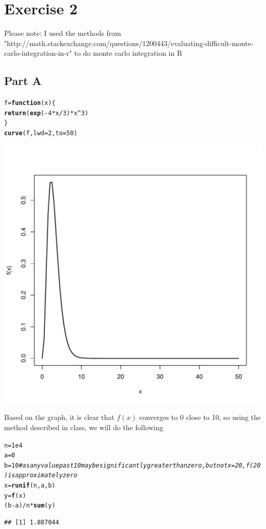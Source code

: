 \documentclass{article}\usepackage[]{graphicx}\usepackage[]{color}
\makeatletter
\newcommand{\hlnum}[1]{\textcolor[rgb]{0.686,0.059,0.569}{#1}}%
\newcommand{\hlcom}[1]{\textcolor[rgb]{0.678,0.584,0.686}{\textit{#1}}}%
\newcommand{\hlopt}[1]{\textcolor[rgb]{0,0,0}{#1}}%
\newcommand{\hlstd}[1]{\textcolor[rgb]{0.345,0.345,0.345}{#1}}%
\newcommand{\hlkwa}[1]{\textcolor[rgb]{0.161,0.373,0.58}{\textbf{#1}}}%
\newcommand{\hlkwb}[1]{\textcolor[rgb]{0.69,0.353,0.396}{#1}}%
\newcommand{\hlkwc}[1]{\textcolor[rgb]{0.333,0.667,0.333}{#1}}%
\newcommand{\hlkwd}[1]{\textcolor[rgb]{0.737,0.353,0.396}{\textbf{#1}}}%
\newenvironment{kframe}{%
 \def\at@end@of@kframe{}%
 \ifinner\ifhmode%
  \def\at@end@of@kframe{\end{minipage}}%
  \begin{minipage}{\columnwidth}%
 \fi\fi%
 \def\FrameCommand##1{\hskip\@totalleftmargin \hskip-\fboxsep
 \colorbox{shadecolor}{##1}\hskip-\fboxsep
     \hskip-\linewidth \hskip-\@totalleftmargin \hskip\columnwidth}%
 \MakeFramed {\advance\hsize-\width
   \@totalleftmargin\z@ \linewidth\hsize
   \@setminipage}}%
 {\par\unskip\endMakeFramed%
 \at@end@of@kframe}
\newenvironment{knitrout}{}{} %
\makeatother
\begin{document}
\section*{Exercise 2}
Please note: I used the methods from "http://math.stackexchange.com/questions/1200443/evaluating-difficult-monte-carlo-integration-in-r" to do monte carlo integration in R
\subsection*{Part A}
\begin{knitrout}
\color{fgcolor}\begin{kframe}
\begin{alltt}
\hlstd{f} \hlkwb{=} \hlkwa{function}\hlstd{(}\hlkwc{x}\hlstd{)\{}
  \hlkwd{return}\hlstd{(}\hlkwd{exp}\hlstd{(}\hlopt{-}\hlnum{4}\hlopt{*}\hlstd{x}\hlopt{/}\hlnum{3}\hlstd{)}\hlopt{*}\hlstd{x}\hlopt{^}\hlnum{3}\hlstd{)}
\hlstd{\}}
\hlkwd{curve}\hlstd{(f,} \hlkwc{lwd}\hlstd{=}\hlnum{2}\hlstd{,}\hlkwc{to} \hlstd{=} \hlnum{50}\hlstd{)}
\end{alltt}
\end{kframe}
\includegraphics[width=0.60\linewidth]{figure/unnamed-chunk-3-1} 

\end{knitrout}
Based on the graph, it is clear that $f(x)$ converges to 0 close to 10, so using the method described in class, we will do the following
\begin{knitrout}
\color{fgcolor}\begin{kframe}
\begin{alltt}
\hlstd{n} \hlkwb{=} \hlnum{1e4}
\hlstd{a} \hlkwb{=} \hlnum{0}
\hlstd{b} \hlkwb{=} \hlnum{10} \hlcom{#as any value past 10 may be significantly greater than zero, but not x = 20, f(20) is approximately zero}
\hlstd{x} \hlkwb{=} \hlkwd{runif}\hlstd{(n, a, b)}
\hlstd{y} \hlkwb{=} \hlkwd{f}\hlstd{(x)}
\hlstd{(b}\hlopt{-}\hlstd{a)}\hlopt{/}\hlstd{n}\hlopt{*}\hlkwd{sum}\hlstd{(y)}
\end{alltt}
\begin{verbatim}
## [1] 1.887044
\end{verbatim}
\end{kframe}
\end{knitrout}
\end{document}
